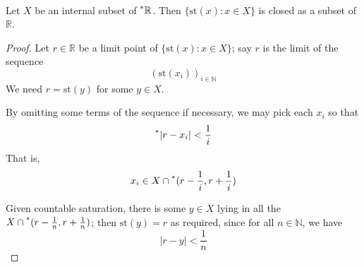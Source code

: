 \documentclass[11pt]{amsart}
\theoremstyle{remark}
\newcommand{\st}{\mathrm{st}}
\newcommand{\hyp}[1][\mathbb{R}]{\prescript{*}{}{#1}}
\begin{document}
\

\begin{lemma} \label{lemma:internalclosed} Let $X$ be an internal subset of $\hyp$. Then $\{ \st(x): x \in X \}$ is closed as a subset of $\mathbb{R}$.
\end{lemma}
\begin{proof}
Let $r \in \mathbb{R}$ be a limit point of $\{ \st(x) : x \in X\}$; say $r$ is the limit of the sequence $$(\st(x_i))_{i \in \mathbb{N}}$$
We need $r = \st(y)$ for some $y \in X$.

By omitting some terms of the sequence if necessary, we may pick each $x_i$ so that $$\hyp[|]r-x_i| < \frac{1}{i}$$
That is, $$x_i \in X \cap \hyp[(]r-\frac{1}{i}, r+\frac{1}{i})$$

Given countable saturation, there is some $y \in X$ lying in all the $X \cap \hyp[(]r-\frac{1}{n}, r+\frac{1}{n})$; then $\st(y) = r$ as required, since for all $n \in \mathbb{N}$, we have $$|r-y| < \frac{1}{n}$$
\end{proof}

\
\end{document}
